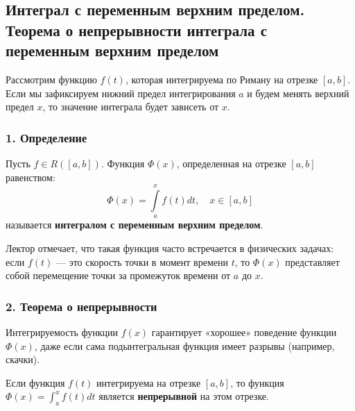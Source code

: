 \subsection{Интеграл с переменным верхним пределом. Теорема о непрерывности интеграла с переменным верхним пределом}

Рассмотрим функцию $f(t)$, которая интегрируема по Риману на отрезке $[a, b]$. Если мы зафиксируем нижний предел интегрирования $a$ и будем менять верхний предел $x$, то значение интеграла будет зависеть от $x$.

\subsubsection*{1. Определение}

\begin{definition}
Пусть $f \in R([a, b])$. Функция $\Phi(x)$, определенная на отрезке $[a, b]$ равенством:
\[ \Phi(x) = \int\limits_a^x f(t) dt, \quad x \in [a, b] \]
называется \textbf{интегралом с переменным верхним пределом}.
\end{definition}

Лектор отмечает, что такая функция часто встречается в физических задачах: если $f(t)$ — это скорость точки в момент времени $t$, то $\Phi(x)$ представляет собой перемещение точки за промежуток времени от $a$ до $x$.

\subsubsection*{2. Теорема о непрерывности}

Интегрируемость функции $f(x)$ гарантирует «хорошее» поведение функции $\Phi(x)$, даже если сама подынтегральная функция имеет разрывы (например, скачки).

\begin{theorem}
Если функция $f(t)$ интегрируема на отрезке $[a, b]$, то функция $\Phi(x) = \int_a^x f(t) dt$ является \textbf{непрерывной} на этом отрезке.
\end{theorem}

